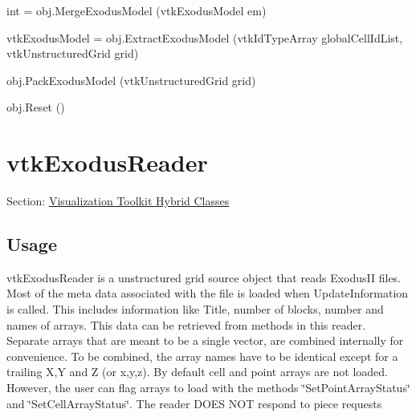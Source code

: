 \begin{DoxyItemize}
\item {\ttfamily int = obj.\-Merge\-Exodus\-Model (vtk\-Exodus\-Model em)}  
\item {\ttfamily vtk\-Exodus\-Model = obj.\-Extract\-Exodus\-Model (vtk\-Id\-Type\-Array global\-Cell\-Id\-List, vtk\-Unstructured\-Grid grid)}  
\item {\ttfamily obj.\-Pack\-Exodus\-Model (vtk\-Unstructured\-Grid grid)}  
\item {\ttfamily obj.\-Reset ()}  
\end{DoxyItemize}\hypertarget{vtkhybrid_vtkexodusreader}{}\section{vtk\-Exodus\-Reader}\label{vtkhybrid_vtkexodusreader}
Section\-: \hyperlink{sec_vtkhybrid}{Visualization Toolkit Hybrid Classes} \hypertarget{vtkwidgets_vtkxyplotwidget_Usage}{}\subsection{Usage}\label{vtkwidgets_vtkxyplotwidget_Usage}
vtk\-Exodus\-Reader is a unstructured grid source object that reads Exodus\-I\-I files. Most of the meta data associated with the file is loaded when Update\-Information is called. This includes information like Title, number of blocks, number and names of arrays. This data can be retrieved from methods in this reader. Separate arrays that are meant to be a single vector, are combined internally for convenience. To be combined, the array names have to be identical except for a trailing X,Y and Z (or x,y,z). By default cell and point arrays are not loaded. However, the user can flag arrays to load with the methods \char`\"{}\-Set\-Point\-Array\-Status\char`\"{} and \char`\"{}\-Set\-Cell\-Array\-Status\char`\"{}. The reader D\-O\-E\-S N\-O\-T respond to piece requests

